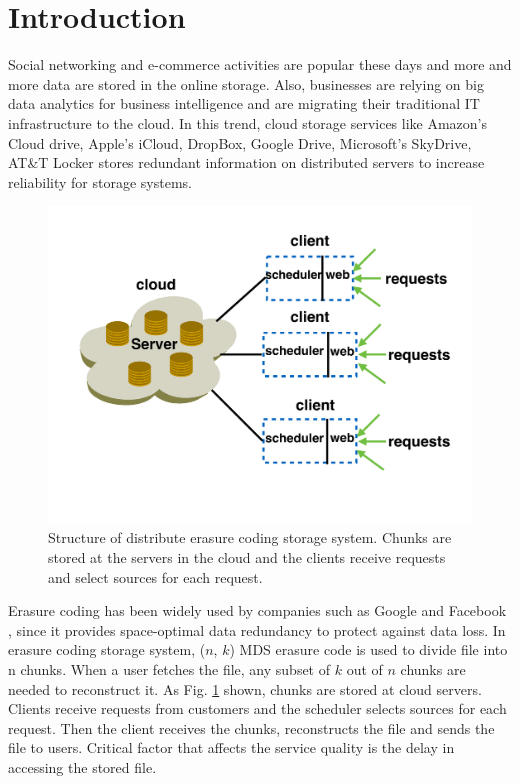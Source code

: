 \documentclass{IEEEtran}
\begin{document}
\section{Introduction} \label{Introduction}
Social networking and e-commerce activities are popular these days and more and more data are stored in the online storage. 
Also, businesses are relying on big data analytics for business intelligence and are migrating their traditional IT infrastructure to the cloud.
In this trend, cloud storage services like Amazon's Cloud drive, Apple's iCloud, DropBox, Google Drive, Microsoft's SkyDrive, AT\&T Locker  stores redundant information on distributed servers to increase reliability for storage systems.

\begin{figure}[b]
\begin{center}
\includegraphics [width=0.7\columnwidth] {./picture/motivation/distribute.pdf}
\caption{Structure of distribute erasure coding storage system. Chunks are stored at the servers in the cloud and the clients receive requests and select sources for each request.}
\label{distribute-fig}
\end{center}
\end{figure}


Erasure coding has been widely used by companies such as Google and Facebook \cite{sathiamoorthy2013xoring} \cite{wu2010cloud}, since it provides space-optimal data redundancy to protect against data loss.
In erasure coding storage system, ($n$, $k$) MDS erasure code is used to divide file into n chunks.
When a user fetches the file, any subset of $k$ out of $n$ chunks are needed to reconstruct it. 
As Fig. \ref{distribute-fig} shown, chunks are stored at cloud servers. 
Clients receive requests from customers and the scheduler selects sources for each request. 
Then the client receives the chunks, reconstructs the file and sends the file to users.
Critical factor that affects the service quality is the delay in accessing the stored file.
\end{document}
